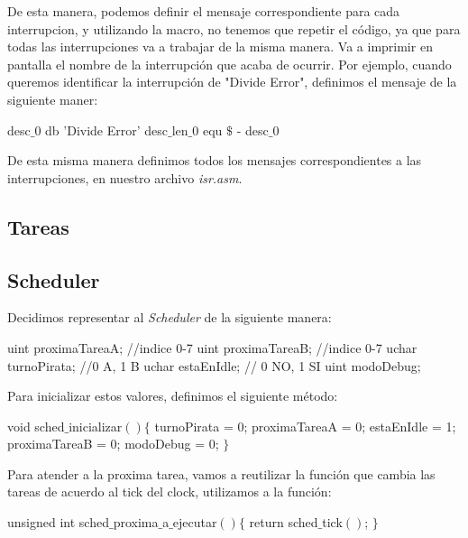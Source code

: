 De esta manera, podemos definir el mensaje correspondiente para cada interrupcion, y utilizando la macro, no tenemos que repetir el c\'odigo, ya que para todas las interrupciones va a trabajar de la misma manera. Va a imprimir en pantalla el nombre de la interrupci\'on que acaba de ocurrir.
Por ejemplo, cuando queremos identificar la interrupci\'on de "Divide Error", definimos el mensaje de la siguiente maner:

\begin{algorithmic}
\State \tab desc$\_$0 db   'Divide Error'
\State \tab desc$\_$len$\_$0 equ     $\$$ - desc$\_$0
\end{algorithmic}

De esta misma manera definimos todos los mensajes correspondientes a las interrupciones, en nuestro archivo \textit{isr.asm}.
\subsection{Tareas}

\subsection{Scheduler}

Decidimos representar al \textit{Scheduler} de la siguiente manera:
\begin{algorithmic}
\State \tab uint proximaTareaA; //indice 0-7
\State \tab uint proximaTareaB; //indice 0-7
\State \tab uchar turnoPirata; //0 A, 1 B
\State \tab uchar estaEnIdle; // 0 NO, 1 SI
\State \tab uint modoDebug;
     
\end{algorithmic}

Para inicializar estos valores, definimos el siguiente m\'etodo:
\begin{algorithmic}
    \State \tab void sched$\_$inicializar$() \{$
    \State \tab \tab    turnoPirata = 0;
    \State \tab \tab    proximaTareaA = 0;
    \State \tab \tab estaEnIdle = 1;
    \State \tab \tab proximaTareaB = 0;
    \State \tab \tab modoDebug = 0;
    \State \tab $\}$
\end{algorithmic}


Para atender a la proxima tarea, vamos a reutilizar la funci\'on que cambia las tareas de acuerdo al tick del clock, utilizamos a la funci\'on:
\begin{algorithmic}
    \State \tab unsigned int sched$\_$proxima$\_$a$\_$ejecutar$() \{$
    \State \tab \tab return sched$\_$tick$()$;
    \State \tab $\}$
\end{algorithmic}


